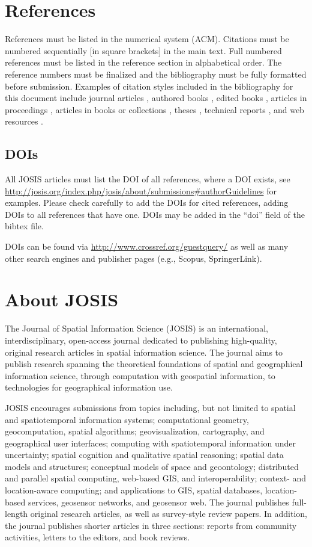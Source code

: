 \documentclass{josis}
\begin{document}
\section{References}
References must be listed in the numerical system (ACM). Citations must be numbered sequentially [in square brackets] in the main text. Full numbered references must be listed in the reference section in alphabetical order. The reference numbers must be finalized and the bibliography must be fully formatted before submission. Examples of citation styles included in the bibliography for this document include journal articles \cite{overEtAl2010,arkin}, authored books \cite{bailey}, edited books \cite{miller09.BOOK}, articles in proceedings \cite{champion11}, articles in books or collections \cite{Grosso12}, theses \cite{ruas99}, technical reports \cite{blasertr}, and web resources \cite{web}. 

\subsection{DOIs}

All JOSIS articles must list the DOI of all references, where a DOI exists, see
\url{http://josis.org/index.php/josis/about/submissions#authorGuidelines} for examples. Please check carefully to add the DOIs for cited references,
adding DOIs to all references that have one. DOIs may be added in the ``doi'' field of the bibtex file.

DOIs can be found via \url{http://www.crossref.org/guestquery/} as well as many
other search engines and publisher pages (e.g., Scopus, SpringerLink).


\section{About JOSIS}

The Journal of Spatial Information Science (JOSIS) is an international, interdisciplinary, open-access journal dedicated to publishing high-quality, original research articles in spatial information science. The journal aims to publish research spanning the theoretical foundations of spatial and geographical information science, through computation with geospatial information, to technologies for geographical information use.

JOSIS encourages submissions from topics including, but not limited to spatial and spatiotemporal information systems; computational geometry, geocomputation, spatial algorithms; geovisualization, cartography, and geographical user interfaces; computing with spatiotemporal information under uncertainty; spatial cognition and qualitative spatial reasoning; spatial data models and structures; conceptual models of space and geoontology; distributed and parallel spatial computing, web-based GIS, and interoperability; context- and location-aware computing; and applications to GIS, spatial databases, location-based services, geosensor networks, and geosensor web. The journal publishes full-length original research articles, as well as survey-style review papers. In addition, the journal publishes shorter articles in three sections: reports from community activities, letters to the editors, and book reviews.
\end{document}
